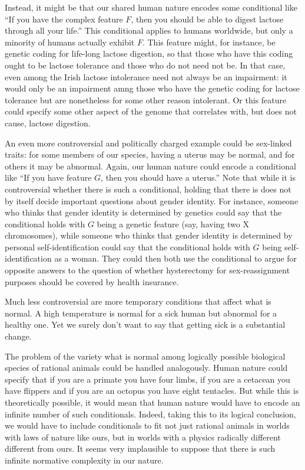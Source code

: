 Instead, it might be that our shared human nature encodes some conditional like ``If you have the complex feature $F$, then you
should be able to digest lactose through all your life.'' This conditional applies to humans worldwide, but only a minority of humans
actually exhibit $F$. This feature might, for instance, be genetic coding for life-long lactose digestion, so that those
who have this coding ought to be lactose tolerance and those who do not need not be. In that case, even among the Irish lactose intolerance
need not always be an impairment: it would only be an impairment amng those who have the genetic coding for lactose tolerance but are
nonetheless for some other reason intolerant. Or this feature could specify some other aspect of the genome that correlates with, but
does not cause, lactose digestion.

An even more controversial and politically charged example could be sex-linked traits: for some members of our species, having a uterus may be normal, and for others
it may be abnormal. Again, our human nature could encode a conditional like ``If you have feature $G$, then you should have a uterus.''
Note that while it is controversial whether there is such a conditional, holding that there is does not by itself decide important questions about gender identity.
For instance, someone who thinks that gender identity is determined by genetics could say that the conditional holds with $G$ being a genetic
feature (say, having two X chromosomes), while someone who thinks that gender identity is determined by personal self-identification could say
that the conditional holds with $G$ being self-identification as a woman. They could then both use the conditional to argue for opposite answers
to the question of whether hysterectomy for sex-reassignment purposes should be covered by health insurance. 

Much less controversial are more temporary conditions that affect what is normal. A high temperature is normal for a sick human but abnormal for a
healthy one. Yet we surely don't want to say that getting sick is a substantial change. 

The problem of the variety what is normal among logically possible biological species of rational animals could be handled analogously. 
Human nature could specify that if you are a primate you have four limbs, if you are a cetacean you have flippers and if you are an octopus you have
eight tentacles. But while this is theoretically possible, it would mean that human nature would have to encode an infinite number of such conditionals.
Indeed, taking this to its logical conclusion, we would have to include conditionals to fit not just rational animals in worlds with laws of nature like ours,
but in worlds with a physics radically different different from ours. It seems very implausible to suppose that there is such infinite normative complexity
in our nature.

